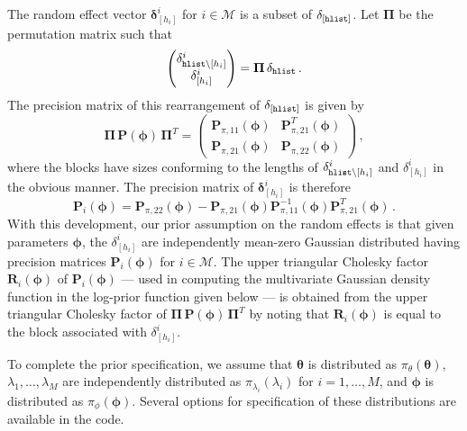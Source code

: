\documentclass[11pt, oneside]{article}   	%
\begin{document}
\noindent
The random effect vector $\mathbf{\delta}_{[h_i]}^i$ for $i \in \mathcal{M}$ is a subset of $\delta_{[\mbox{{\scriptsize {\tt hlist}}}]}$.  Let $\mathbf{\Pi}$ be the permutation matrix such that
\[
\begin{pmatrix}
\delta_{\mbox{{\scriptsize {\tt hlist}}} \setminus [h_i]}^i \\
\delta_{[h_i]}^i 
\end{pmatrix} = \mathbf{\Pi} \, \delta_{\mbox{{\scriptsize {\tt hlist}}}} \,.
\]
The precision matrix of this rearrangement of $\delta_{[\mbox{{\scriptsize {\tt hlist}}}]}$ is given by
\[
\mathbf{\Pi} \, \mathbf{P}(\mathbf{\phi}) \, \mathbf{\Pi}^T = \begin{pmatrix}
\mathbf{P}_{\pi,11} (\mathbf{\phi})& \mathbf{P}_{\pi,21}^T (\mathbf{\phi}) \\
\mathbf{P}_{\pi,21} (\mathbf{\phi}) & \mathbf{P}_{\pi,22} (\mathbf{\phi})
\end{pmatrix} \,,
\]
where the blocks have sizes conforming to the lengths of $\delta_{\mbox{{\scriptsize {\tt hlist}}} \setminus [h_i]}^i$ and $\delta_{[h_i]}^i$ in the obvious manner.  The precision matrix of $\mathbf{\delta}_{[h_i]}^i$ is therefore
\[
\mathbf{P}_i (\mathbf{\phi}) = \mathbf{P}_{\pi,22} (\mathbf{\phi}) - \mathbf{P}_{\pi,21} (\mathbf{\phi}) \mathbf{P}_{\pi,11}^{-1} (\mathbf{\phi}) \mathbf{P}_{\pi,21}^T (\mathbf{\phi}) \,.
\]
With this development, our prior assumption on the random effects is that given parameters $\mathbf{\phi}$, the $\delta_{[h_i]}^i$ are independently mean-zero Gaussian distributed having precision matrices $\mathbf{P}_i (\mathbf{\phi})$ for $i \in \mathcal{M}$.  The upper triangular Cholesky factor $\mathbf{R}_i (\mathbf{\phi})$ of $\mathbf{P}_i (\mathbf{\phi})$ --- used in computing the multivariate Gaussian density function in the log-prior function given below --- is obtained from the upper triangular Cholesky factor of $\mathbf{\Pi} \, \mathbf{P}(\mathbf{\phi}) \, \mathbf{\Pi}^T$ by noting that $\mathbf{R}_i (\mathbf{\phi})$ is equal to the block associated with $\delta_{[h_i]}^i$.

\vspace{5mm}

\noindent
To complete the prior specification, we assume that $\mathbf{\theta}$ is distributed as $\pi_\theta (\mathbf{\theta})$, $\lambda_1, \ldots, \lambda_M$ are independently distributed as $\pi_{\lambda_i} (\lambda_i)$ for $i =1, \ldots, M$, and $\mathbf{\phi}$ is distributed as $\pi_\phi (\mathbf{\phi})$.  Several options for specification of these distributions are available in the code.
\end{document}

